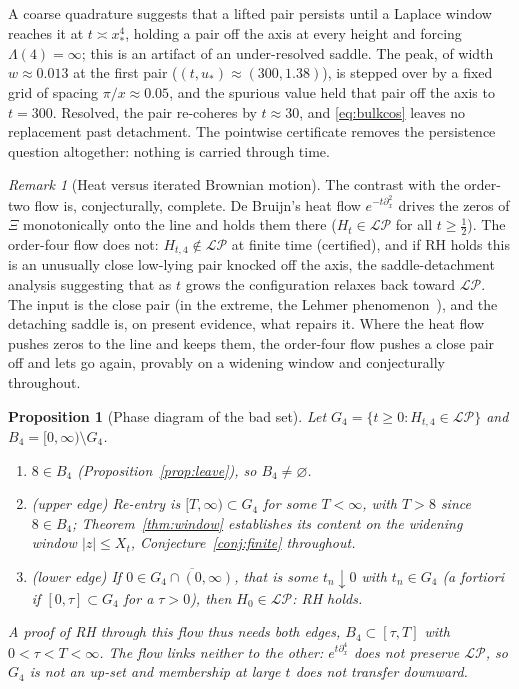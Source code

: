 \documentclass[11pt,reqno]{amsart}
\theoremstyle{plain}
\newtheorem{proposition}[theorem]{Proposition}
\theoremstyle{definition}
\theoremstyle{remark}
\newtheorem{remark}[theorem]{Remark}
\newcommand{\LP}{\mathcal{LP}}
\begin{document}
A coarse quadrature suggests that a lifted pair persists
until a Laplace window reaches it at $t\asymp x_*^4$, holding a pair off the axis
at every height and forcing $\Lambda(4)=\infty$; this is an artifact of an
under-resolved saddle. The peak, of width $w\approx0.013$ at the first pair
($(t,u_*)\approx(300,1.38)$), is stepped over by a fixed grid of spacing
$\pi/x\approx0.05$, and the spurious value held that pair off the axis to
$t=300$. Resolved, the pair re-coheres by $t\approx30$, and \eqref{eq:bulkcos}
leaves no replacement past detachment. The pointwise certificate removes the
persistence question altogether: nothing is carried through time.

\begin{remark}[Heat versus iterated Brownian motion]\label{rem:consistency}
The contrast with the order-two flow is, conjecturally, complete. De Bruijn's heat
flow $e^{-t\partial_x^2}$ drives the zeros of $\Xi$ monotonically onto the line
and holds them there ($H_t\in\LP$ for all $t\ge\tfrac12$). The order-four flow does not: $H_{t,4}\notin\LP$ at finite time (certified), and
if RH holds this is an unusually close low-lying pair knocked off the axis, the
saddle-detachment analysis suggesting that as $t$ grows the configuration
relaxes back toward $\LP$. The input is the close pair (in the extreme, the
Lehmer phenomenon~\cite{CSV}), and the detaching saddle is, on present evidence,
what repairs it. Where the heat flow pushes zeros to the line and keeps them, the
order-four flow pushes a close pair off and lets go again, provably on a widening
window and conjecturally throughout.
\end{remark}

\begin{proposition}[Phase diagram of the bad set]\label{prop:rh}
Let $G_4=\{t\ge0:H_{t,4}\in\LP\}$ and $B_4=[0,\infty)\setminus G_4$.
\begin{enumerate}
\item[(i)] $8\in B_4$ (Proposition~\ref{prop:leave}), so $B_4\neq\varnothing$.
\item[(ii)] {\rm(upper edge)} Re-entry is $[T,\infty)\subset G_4$ for some
$T<\infty$, with $T>8$ since $8\in B_4$; Theorem~\ref{thm:window} establishes its
content on the widening window $|z|\le X_t$, Conjecture~\ref{conj:finite}
throughout.
\item[(iii)] {\rm(lower edge)} If $0\in\overline{G_4\cap(0,\infty)}$, that is some
$t_n\downarrow0$ with $t_n\in G_4$ (a fortiori if $[0,\tau]\subset G_4$ for a
$\tau>0$), then $H_0\in\LP$: RH holds.
\end{enumerate}
A proof of RH through this flow thus needs both edges, $B_4\subset[\tau,T]$ with
$0<\tau<T<\infty$. The flow links neither to the other: $e^{t\partial_x^4}$ does
not preserve $\LP$, so $G_4$ is not an up-set and membership at large $t$ does
not transfer downward.
\end{proposition}
\end{document}
